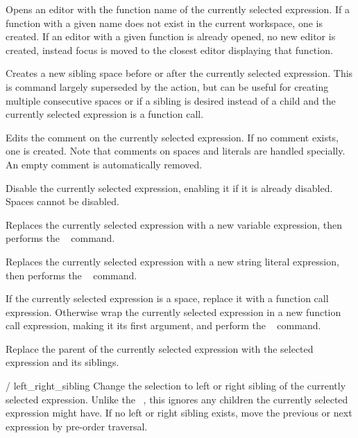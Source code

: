 Opens an editor with the function name of the currently selected expression.
If a function with a given name does not exist in the current workspace, one is
created.
If an editor with a given function is already opened, no new editor is created,
instead focus is moved to the closest editor displaying that function.


Creates a new sibling space before or after the currently selected
expression. This is command largely superseded by the
\hyperref[cmd:smart_space]{} \keys{\SPACE} action, but can be
useful for creating multiple consecutive spaces or if a sibling is desired
instead of a child and the currently selected expression is a function call.

Edits the comment on the currently selected expression. If no comment exists,
one is created. Note that comments on spaces and literals are handled
specially. An empty comment is automatically removed.

Disable the currently selected expression, enabling it if it is already
disabled. Spaces cannot be disabled.

Replaces the currently selected expression with a new variable expression, then
performs the \hyperref[cmd:edit]{}~\keys{\return} command.

Replaces the currently selected expression with a new string literal
expression, then
performs the \hyperref[cmd:edit]{}~\keys{\return} command.

If the currently selected expression is a space, replace it with a function
call expression. Otherwise wrap the currently selected expression in a new
function call expression, making it its first argument, and perform
the \hyperref[cmd:edit]{}~\keys{\return} command.

Replace the parent of the currently selected expression with the selected
expression and its siblings. 

	{ / }{left_right_sibling}
Change the selection to left or right sibling of the currently selected
expression. Unlike the \ak{^}~, this ignores any children the
currently selected expression might have. If no left or right sibling
exists, move the previous or next expression by pre-order traversal.

